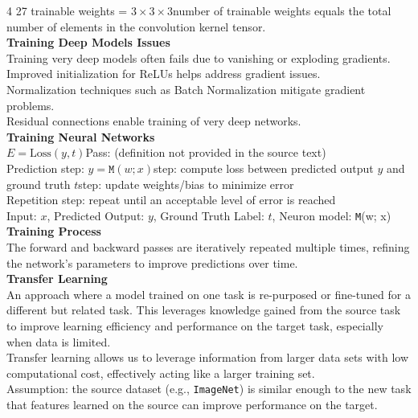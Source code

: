 \documentclass[8pt]{extarticle}
\begin{document}
\begin{multicols}{4}
27 trainable weights = $3 \times 3 \times 3$\The number of trainable weights equals the total number of elements in the convolution kernel tensor.\\
\vspace{2pt}\textbf{Training Deep Models Issues}\\
Training very deep models often fails due to vanishing or exploding gradients.\\
Improved initialization for ReLUs helps address gradient issues.\\
Normalization techniques such as Batch Normalization mitigate gradient problems.\\
Residual connections enable training of very deep networks.\\
\vspace{2pt}\textbf{Training Neural Networks}\\
$E = \text{Loss}(y, t)$\Forward Pass: (definition not provided in the source text)\\
Prediction step: $y = \texttt{M}(w; x)$\Comparison step: compute loss between predicted output $y$ and ground truth $ t$\Adjustment step: update weights/bias to minimize error\\
Repetition step: repeat until an acceptable level of error is reached\\
Input: $x$, Predicted Output: $ y$, Ground Truth Label: $ t$, Neuron model: \texttt{M}(w; x)\\
\vspace{2pt}\textbf{Training Process}\\
The forward and backward passes are iteratively repeated multiple times, refining the network's parameters to improve predictions over time.\\
\vspace{2pt}\textbf{Transfer Learning}\\
An approach where a model trained on one task is re-purposed or fine-tuned for a different but related task. This leverages knowledge gained from the source task to improve learning efficiency and performance on the target task, especially when data is limited.\\
Transfer learning allows us to leverage information from larger data sets with low computational cost, effectively acting like a larger training set.\\
Assumption: the source dataset (e.g., \texttt{ImageNet}) is similar enough to the new task that features learned on the source can improve performance on the target.\\

\end{multicols}
\end{document}
